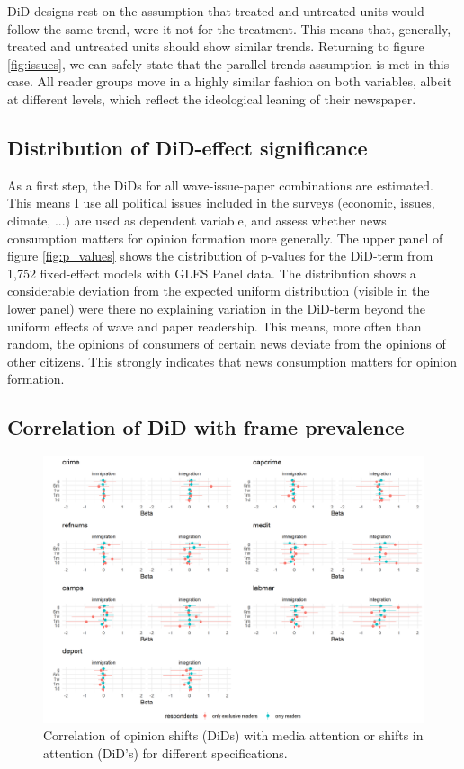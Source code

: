 \documentclass{article}
\begin{document}
DiD-designs rest on the assumption that treated and untreated units would follow the same trend, were it not for the treatment. This means that, generally, treated and untreated units should show similar trends. Returning to figure \ref{fig:issues}, we can safely state that the parallel trends assumption is met in this case. All reader groups move in a highly similar fashion on both variables, albeit at different levels, which reflect the ideological leaning of their newspaper.

\subsection{Distribution of DiD-effect significance}

As a first step, the DiDs for all wave-issue-paper combinations are estimated. This means I use all political issues included in the surveys (economic, issues, climate, ...) are used as dependent variable, and assess whether news consumption matters for opinion formation more generally. The upper panel of figure \ref{fig:p_values} shows the distribution of p-values for the DiD-term from 1,752 fixed-effect models with GLES Panel data. The distribution shows a considerable deviation from the expected uniform distribution (visible in the lower panel) were there no explaining variation in the DiD-term beyond the uniform effects of wave and paper readership. This means, more often than random, the opinions of consumers of certain news deviate from the opinions of other citizens. This strongly indicates that news consumption matters for opinion formation.




\subsection{Correlation of DiD with frame prevalence}
\begin{figure}[!ht]
    \centering
    \includegraphics[width=\textwidth]{paper/vis/effectplot_frames.png}
    \caption{Correlation of opinion shifts (DiDs) with media attention or shifts in attention (DiD's) for different specifications.}
    \label{fig:did_corr}
\end{figure}
\end{document}
